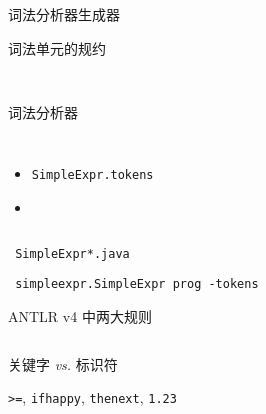 
\begin{frame}{}
  \begin{center}
    词法分析器生成器
  \end{center}
\end{frame}

\begin{frame}{}
  \begin{center}
     词法单元的规约

    \vspace{0.50cm}
    \texttt{ }

    \pause
    \vspace{1.00cm}
     词法分析器

    \begin{columns}
        \begin{itemize}
          \setlength{\itemsep}{8pt}
          \item \texttt{SimpleExpr.tokens}
          \item \texttt{}
        \end{itemize}
    \end{columns}

    \pause
    \vspace{1.00cm}
    \texttt{ SimpleExpr*.java}

    \vspace{0.20cm}
    \texttt{ simpleexpr.SimpleExpr prog -tokens}
  \end{center}
\end{frame}

\begin{frame}{}
\end{frame}

\begin{frame}{}
  \begin{center}
    ANTLR v4 中两大规则

    \vspace{1.20cm}
	\begin{columns}[]
	  \begin{description}
		\setlength{\itemsep}{15pt}
		\item[最前优先匹配:] 关键字 \emph{vs.} 标识符
		\item[最长优先匹配:] \texttt{>=}, \texttt{ifhappy}, \texttt{thenext}, \texttt{1.23}
	  \end{description}
	\end{columns}
  \end{center}
\end{frame}
